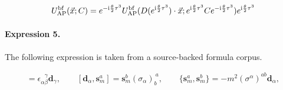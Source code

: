 \documentclass[11pt]{article}
\begin{document}
\begin{align*}U^{\mathrm{bf}}_{\mathrm{AP}}(\vec x;C) =e^{-\mathrm{i} {\theta\over 2}\tau^3} U^{\mathrm{bf}}_{\mathrm{AP}} (D(e^{\mathrm{i} {\theta\over 2}\tau^3})\cdot\vec x;e^{\mathrm{i}{\theta\over 2}\tau^3} C e^{-\mathrm{i}{\theta\over 2}\tau^3})e^{\mathrm{i} {\theta\over 2}\tau^3}\end{align*}

\paragraph{Expression 5.} The following expression is taken from a source-backed formula corpus.

\begin{align*}[ \mathbf{d}_\alpha, \mathbf{d}_\beta ] = \epsilon_{\alpha\beta}^{~~~\!\gamma} \mathbf{d}_\gamma, \qquad[ \mathbf{d}_\alpha, \mathbf{s}_m^a ] = \mathbf{s}_m^b (\sigma_\alpha)_b^{~a},\qquad\{ \mathbf{s}_m^a, \mathbf{s}_m^b \} = - m^2 (\sigma^\alpha)^{ab} \mathbf{d}_\alpha,\end{align*}
\end{document}
